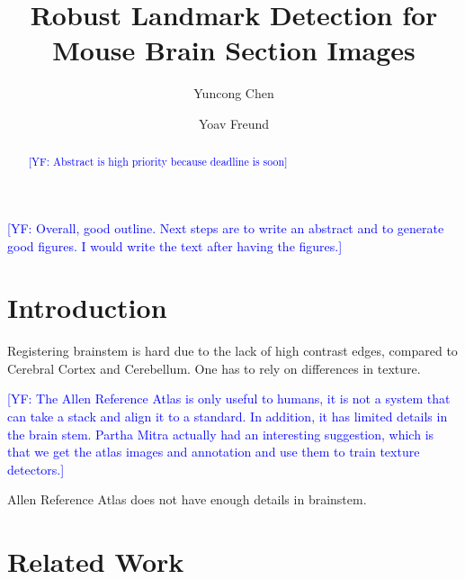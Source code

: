 \documentclass{llncs}
\newcommand{\authcmt}[2]{\textcolor{#1}{#2}}
\newcommand{\yoav}[1]{\authcmt{blue}{[YF: #1]}}
\begin{document}
%
%
\title{Robust Landmark Detection for Mouse Brain Section Images}
%
%
\author{Yuncong Chen \and Yoav Freund}
%
%
%




\maketitle              %

\begin{abstract}

\yoav{Abstract is high priority because deadline is soon}

\end{abstract}
%

\yoav{Overall, good outline. Next steps are to write an abstract and
  to generate good figures. I would write the text after having the
  figures.}

\section{Introduction}
%

Registering brainstem is hard due to the lack of high contrast edges,
compared to Cerebral Cortex and Cerebellum. One has to rely on
differences in texture.

\yoav{The Allen Reference Atlas is only useful to humans, it is not a
  system that can take a stack and align it to a standard. In
  addition, it has limited details in the brain stem. Partha Mitra
  actually had an interesting suggestion, which is that we get the
  atlas images and annotation and use them to train texture
  detectors.}

Allen Reference Atlas does not have enough details in brainstem.

\section{Related Work}
\end{document}

